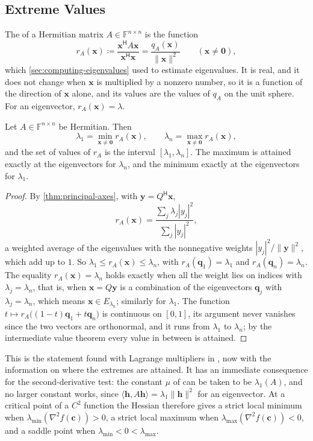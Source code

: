 \subsection{Extreme Values}

The  of a Hermitian matrix $A\in\mathbb F^{n\times n}$ is the function
\[
r_A(\mathbf x)\coloneqq\frac{\mathbf x^{\mathsf H}A\mathbf x}{\mathbf x^{\mathsf H}\mathbf x}=\frac{q_A(\mathbf x)}{\|\mathbf x\|^2}\qquad(\mathbf x\ne\mathbf 0),
\]
which \cref{sec:computing-eigenvalues} used to estimate eigenvalues. It is real, and it does not change when $\mathbf x$ is multiplied by a nonzero number, so it is a function of the direction of $\mathbf x$ alone, and its values are the values of $q_A$ on the unit sphere. For an eigenvector, $r_A(\mathbf x)=\lambda$.

\begin{theorem}
\label{thm:rayleigh}
Let $A\in\mathbb F^{n\times n}$ be Hermitian. Then
\[
\lambda_1=\min_{\mathbf x\ne\mathbf 0}r_A(\mathbf x),\qquad\lambda_n=\max_{\mathbf x\ne\mathbf 0}r_A(\mathbf x),
\]
and the set of values of $r_A$ is the interval $[\lambda_1,\lambda_n]$. The maximum is attained exactly at the eigenvectors for $\lambda_n$, and the minimum exactly at the eigenvectors for $\lambda_1$.
\end{theorem}

\begin{proof}
By \cref{thm:principal-axes}, with $\mathbf y=Q^{\mathsf H}\mathbf x$,
\[
r_A(\mathbf x)=\frac{\sum_j\lambda_j|y_j|^2}{\sum_j|y_j|^2},
\]
a weighted average of the eigenvalues with the nonnegative weights $|y_j|^2/\|\mathbf y\|^2$, which add up to $1$. So $\lambda_1\le r_A(\mathbf x)\le\lambda_n$, with $r_A(\mathbf q_1)=\lambda_1$ and $r_A(\mathbf q_n)=\lambda_n$. The equality $r_A(\mathbf x)=\lambda_n$ holds exactly when all the weight lies on indices with $\lambda_j=\lambda_n$, that is, when $\mathbf x=Q\mathbf y$ is a combination of the eigenvectors $\mathbf q_j$ with $\lambda_j=\lambda_n$, which means $\mathbf x\in E_{\lambda_n}$; similarly for $\lambda_1$. The function $t\mapsto r_A\bigl((1-t)\mathbf q_1+t\mathbf q_n\bigr)$ is continuous on $[0,1]$, its argument never vanishes since the two vectors are orthonormal, and it runs from $\lambda_1$ to $\lambda_n$; by the intermediate value theorem every value in between is attained.
\end{proof}

This is the statement found with Lagrange multipliers in , now with the information on where the extremes are attained. It has an immediate consequence for the second-derivative test: the constant $\mu$ of  can be taken to be $\lambda_1(A)$, and no larger constant works, since $\langle\mathbf h,A\mathbf h\rangle=\lambda_1\|\mathbf h\|^2$ for an eigenvector. At a critical point of a $C^2$ function the Hessian therefore gives a strict local minimum when $\lambda_{\min}(\nabla^2f(\mathbf c))>0$, a strict local maximum when $\lambda_{\max}(\nabla^2f(\mathbf c))<0$, and a saddle point when $\lambda_{\min}<0<\lambda_{\max}$.

